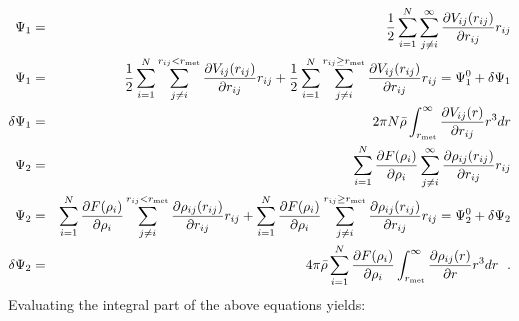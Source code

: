 \begin{eqnarray}
\Psi_{1} &=& {1 \over 2} \sum_{i=1}^{N} \sum_{j \ne i}^{\infty}
\frac{\partial V_{ij}(r_{ij})}{\partial r_{ij}} r_{ij} \nonumber \\
\Psi_{1} &=& {1 \over 2} \sum_{i=1}^{N} \sum_{j \ne i}^{r_{ij}<r_{\rm met}}
\frac{\partial V_{ij}(r_{ij})}{\partial r_{ij}} r_{ij} +
{1 \over 2} \sum_{i=1}^{N} \sum_{j \ne i}^{r_{ij} \ge r_{\rm met}}
\frac{\partial V_{ij}(r_{ij})}{\partial r_{ij}} r_{ij} = \Psi_{1}^{0} + \delta \Psi_{1} \nonumber \\
\delta \Psi_{1} &=& 2 \pi N \bar{\rho} \int_{r_{\rm met}}^{\infty}
\frac{\partial V_{ij}(r)}{\partial r_{ij}} r^{3} dr \nonumber \\
\Psi_{2} &=& \sum_{i=1}^{N} \frac{\partial F(\rho_{i})}{\partial \rho_{i}}
\sum_{j \ne i}^{\infty} \frac{\partial \rho_{ij}(r_{ij})}{\partial r_{ij}} r_{ij} \\
\Psi_{2} &=& \sum_{i=1}^{N} \frac{\partial F(\rho_{i})}{\partial \rho_{i}}
\sum_{j \ne i}^{r_{ij}<r_{\rm met}} \frac{\partial \rho_{ij}(r_{ij})}{\partial r_{ij}} r_{ij} +
\sum_{i=1}^{N} \frac{\partial F(\rho_{i})}{\partial \rho_{i}}
\sum_{j \ne i}^{r_{ij} \ge r_{\rm met}} \frac{\partial \rho_{ij}(r_{ij})}{\partial r_{ij}} r_{ij} = \Psi_{2}^{0} + \delta \Psi_{2} \nonumber \\
\delta \Psi_{2} &=& 4 \pi \bar{\rho} \sum_{i=1}^{N} \frac{\partial F(\rho_{i})}{\partial \rho_{i}}
\int_{r_{\rm met}}^{\infty} \frac{\partial \rho_{ij}(r)}{\partial r} r^{3} dr~~. \nonumber
\end{eqnarray}
Evaluating the integral part of the above equations yields:
